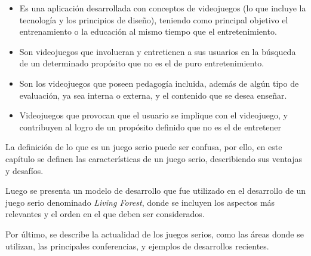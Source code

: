 \begin{itemize}
    \item Es una aplicación desarrollada con conceptos de videojuegos (lo que
        incluye la tecnología y los principios de diseño), teniendo como
        principal objetivo el entrenamiento o la educación al mismo tiempo que
        el entretenimiento\cite{ludus:sg}.
    \item Son videojuegos que involucran y entretienen a sus usuarios en la
        búsqueda de un determinado propósito que no es el de puro
        entretenimiento\cite{ludus:sg}.
    \item Son los videojuegos que poseen pedagogía incluida, además de algún tipo de
        evaluación, ya sea interna o externa, y el contenido que se desea
        enseñar\cite{damien:sg,sg:aoverview}.
    \item Videojuegos que provocan que el usuario se implique con el videojuego, y
        contribuyen al logro de un propósito definido que no es el de
        entretener\cite{sg:aoverview}
\end{itemize}

La definición de lo que es un juego serio puede ser confusa, por ello, en este
capítulo se definen las características de un juego serio, describiendo sus
ventajas y desafíos. 

Luego se presenta un modelo de desarrollo que fue utilizado en el desarrollo de
un juego serio denominado \textit{Living Forest}, donde se incluyen los aspectos
más relevantes y el orden en el que deben ser considerados.

Por último, se describe la actualidad de los juegos serios, como las áreas donde
se utilizan, las principales conferencias, y ejemplos de desarrollos recientes. 







